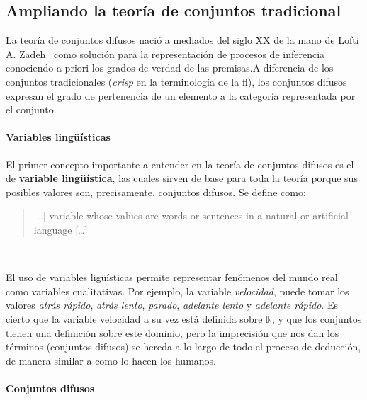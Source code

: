 \subsection{Ampliando la teoría de conjuntos tradicional}

La teoría de conjuntos difusos nació a mediados del siglo XX de la mano de Lofti A. Zadeh~\cite{lofti1965fuzzy} como solución para la representación de procesos de inferencia conociendo a priori los grados de verdad de las premisas.A diferencia de los conjuntos tradicionales (\textit{crisp} en la terminología de la \ac{fl}), los conjuntos difusos expresan el grado de pertenencia de un elemento a la categoría representada por el conjunto.

\paragraph{Variables lingüísticas}

El primer concepto importante a entender en la teoría de conjuntos difusos es el de \textbf{variable lingüística}, las cuales sirven de base para toda la teoría porque sus posibles valores son, precisamente, conjuntos difusos. Se define como:

\blockquote{[\ldots] variable whose values are words or sentences in a natural or artificial language [\ldots]}~\cite{zadeh1975concept}

El uso de variables ligüísticas permite representar fenómenos del mundo real como variables cualitativas. Por ejemplo, la variable \textit{velocidad}, puede tomar los valores \textit{atrás rápido}, \textit{atrás lento}, \textit{parado}, \textit{adelante lento} y \textit{adelante rápido}. Es cierto que la variable velocidad a su vez está definida sobre $\mathbb{R}$, y que los conjuntos tienen una definición sobre este dominio, pero la imprecisión que nos dan los términos (conjuntos difusos) se hereda a lo largo de todo el proceso de deducción, de manera similar a como lo hacen los humanos.

\paragraph{Conjuntos difusos}

